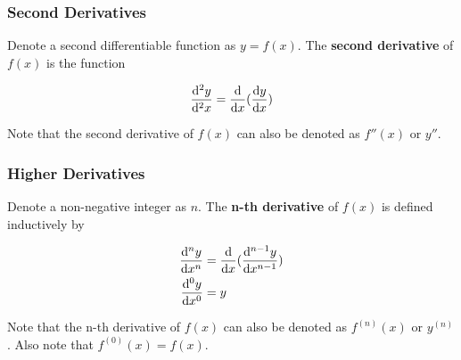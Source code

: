 \documentclass[a4paper,12pt]{article}
\begin{document}
\subsubsection{Second Derivatives}
\begin{dft}
  Denote a second differentiable function as $y=f(x)$. The \textbf{second derivative} of $f(x)$ is the function

  $$\frac{\mathrm{d} ^2 y}{\mathrm{d} ^2 x}=\frac{\mathrm{d} }{\mathrm{d}  x}(\frac{\mathrm{d}  y}{\mathrm{d}  x})$$
\end{dft}\n

Note that the second derivative of $f(x)$ can also be denoted as $f''(x)$ or $y''$.

\subsubsection{Higher Derivatives}
\begin{dft}
  Denote a non-negative integer as $n$. The \textbf{n-th derivative} of $f(x)$ is defined inductively by

  $$\begin{aligned}[t]
    \frac{\mathrm{d} ^{n} y}{\mathrm{d}  x^{n}}&=\frac{\mathrm{d} }{\mathrm{d}  x}(\frac{\mathrm{d} ^{n-1} y}{\mathrm{d}  x^{n-1}})\\
    \frac{\mathrm{d} ^{0} y}{\mathrm{d}  x^{0}}&=y
  \end{aligned}$$
\end{dft}\n

Note that the n-th derivative of $f(x)$ can also be denoted as $f^{(n)}(x)$ or $y^{(n)}$. Also note that $f^{(0)}(x)=f(x)$.
\end{document}
